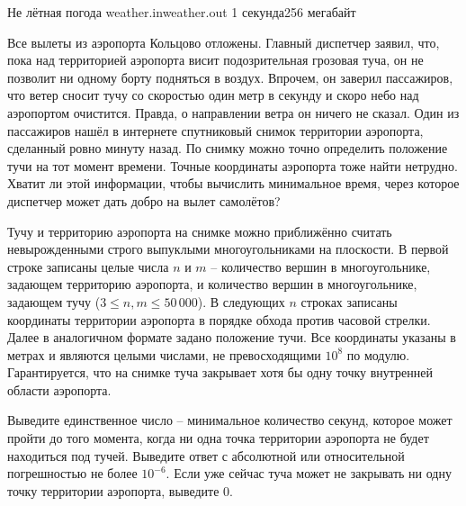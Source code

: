 
\begin{problem}{Не лётная погода}
{weather.in}{weather.out}
{1 секунда}{256 мегабайт}{}

Все вылеты из аэропорта Кольцово отложены. Главный диспетчер заявил, что, пока над территорией аэропорта висит подозрительная грозовая туча, он не позволит ни одному борту подняться в воздух. Впрочем, он заверил пассажиров, что ветер сносит тучу со скоростью один метр в секунду и скоро небо над аэропортом очистится. Правда, о направлении ветра он ничего не сказал.
Один из пассажиров нашёл в интернете спутниковый снимок территории аэропорта, сделанный ровно минуту назад. По снимку можно точно определить положение тучи на тот момент времени. Точные координаты аэропорта тоже найти нетрудно. Хватит ли этой информации, чтобы вычислить минимальное время, через которое диспетчер может дать добро на вылет самолётов?

\InputFile

Тучу и территорию аэропорта на снимке можно приближённо считать невырожденными строго выпуклыми многоугольниками на плоскости. 
В первой строке записаны целые числа $n$ и $m$ -- количество вершин в многоугольнике, задающем территорию аэропорта, и количество вершин в многоугольнике, задающем тучу ($3 \le n, m \le 50\,000$). В следующих $n$ строках записаны координаты территории аэропорта в порядке обхода против часовой стрелки. 
Далее в аналогичном формате задано положение тучи. Все координаты указаны в метрах и являются целыми числами, не превосходящими $10^8$ по модулю. 
Гарантируется, что на снимке туча закрывает хотя бы одну точку внутренней области аэропорта.

\OutputFile

Выведите единственное число -- минимальное количество секунд, которое может пройти до того момента, когда ни одна точка территории аэропорта не будет находиться под тучей. Выведите ответ с абсолютной или относительной погрешностью не более $10^{-6}$. Если уже сейчас туча может не закрывать ни одну точку территории аэропорта, выведите $0$.

\Examples

\begin{example}
%
\end{example}

\end{problem}
